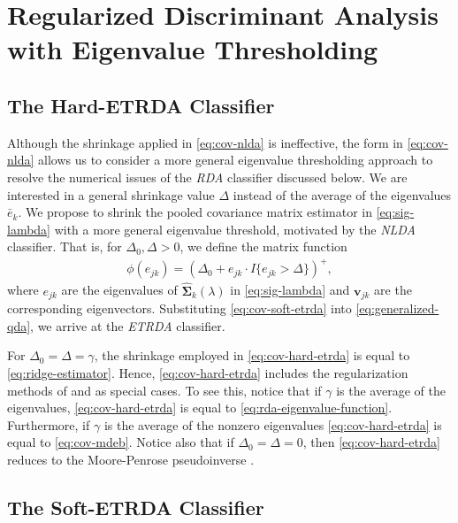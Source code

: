 \documentclass[11pt]{article}
\begin{document}
\section{Regularized Discriminant Analysis with Eigenvalue Thresholding}

\subsection{The Hard-ETRDA Classifier}


Although the shrinkage applied in \eqref{eq:cov-nlda} is ineffective, the form in \eqref{eq:cov-nlda} allows us to consider a more general eigenvalue thresholding approach to resolve the numerical issues of the \emph{RDA} classifier discussed below. We are interested in a general shrinkage value $\Delta$ instead of the average of the eigenvalues $\bar{e}_k$. We propose to shrink the pooled covariance matrix estimator in \eqref{eq:sig-lambda} with a more general eigenvalue threshold, motivated by the \emph{NLDA} classifier. That is, for $\Delta_0, \Delta > 0$, we define the matrix function
\begin{align}
	\phi(e_{jk}) = (\Delta_0 + e_{jk} \cdot I\{e_{jk} > \Delta\} )^{+},\label{eq:cov-hard-etrda}
\end{align}
where $e_{jk}$ are the eigenvalues of $\widehat{\bm \Sigma}_k(\lambda)$ in \eqref{eq:sig-lambda} and $\bm v_{jk}$ are the corresponding eigenvectors. Substituting \eqref{eq:cov-soft-etrda} into \eqref{eq:generalized-qda}, we arrive at the \emph{ETRDA} classifier.

For $\Delta_0 = \Delta = \gamma$, the shrinkage employed in \eqref{eq:cov-hard-etrda} is equal to \eqref{eq:ridge-estimator}. Hence, \eqref{eq:cov-hard-etrda} includes the regularization methods of \cite{Friedman:1989tm} and \cite{Srivastava:2007ww} as special cases. To see this, notice that if $\gamma$ is the average of the eigenvalues, \eqref{eq:cov-hard-etrda} is equal to \eqref{eq:rda-eigenvalue-function}. Furthermore, if $\gamma$ is the average of the nonzero eigenvalues \eqref{eq:cov-hard-etrda} is equal to \eqref{eq:cov-mdeb}. Notice also that if $\Delta_0 = \Delta = 0$, then \eqref{eq:cov-hard-etrda} reduces to the Moore-Penrose pseudoinverse \citep{Harville:2008wja}.


\subsection{The Soft-ETRDA Classifier}
\end{document}
